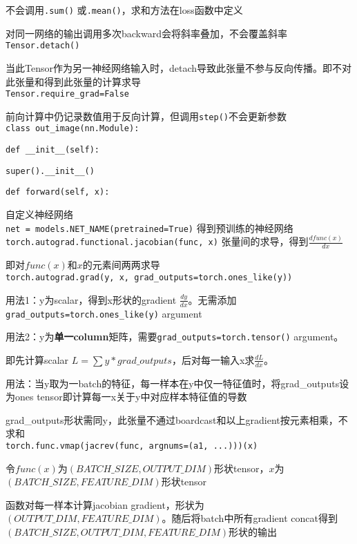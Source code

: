 \documentclass[UTF8]{ctexart}
\begin{document}
  不会调用\texttt{.sum()} 或\texttt{.mean()}，求和方法在loss函数中定义
  
  对同一网络的输出调用多次backward会将斜率叠加，不会覆盖斜率\\
\texttt{Tensor.detach()}

  当此Tensor作为另一神经网络输入时，detach导致此张量不参与反向传播。即不对此张量和得到此张量的计算求导\\
\texttt{Tensor.require\_grad=False}

  前向计算中仍记录数值用于反向计算，但调用\texttt{step()}不会更新参数\\
\texttt{class out\_image(nn.Module):}

  \texttt{def \_\_init\_\_(self):}

  \quad \texttt{super().\_\_init\_\_()}

  \texttt{def forward(self, x):}

  \quad 自定义神经网络\\
\texttt{net = models.NET\_NAME(pretrained=True)} 得到预训练的神经网络\\
\texttt{torch.autograd.functional.jacobian(func, x)} 张量间的求导，得到$\frac{d func(x)}{d x}$

  即对$func(x)$和$x$的元素间两两求导\\
\texttt{torch.autograd.grad(y, x, grad\_outputs=torch.ones\_like(y))} 

  用法1：y为scalar，得到x形状的gradient $\frac{d y}{d x}$。无需添加\texttt{grad\_outputs=torch.ones\_like(y)} argument

  用法2：y为\textbf{单一column}矩阵，需要\texttt{grad\_outputs=torch.tensor()} argument。

  \quad 即先计算scalar $L = \sum y * grad\_outputs$，后对每一输入x求$\frac{d L}{d x}$。
  
  \quad \quad 用法：当y取为一batch的特征，每一样本在y中仅一特征值时，将grad\_outputs设为ones tensor即计算每一x关于y中对应样本特征值的导数
  
  \quad grad\_outputs形状需同y，此张量不通过boardcast和以上gradient按元素相乘，不求和\\
\texttt{torch.func.vmap(jacrev(func, argnums=(a1, ...)))(x)} 

  令$func(x)$为$(BATCH\_SIZE, OUTPUT\_DIM)$形状tensor，$x$为$(BATCH\_SIZE, FEATURE\_DIM)$形状tensor

  函数对每一样本计算jacobian gradient，形状为$(OUTPUT\_DIM, FEATURE\_DIM)$。随后将batch中所有gradient concat得到$(BATCH\_SIZE, OUTPUT\_DIM, FEATURE\_DIM)$形状的输出
  
\end{document}
